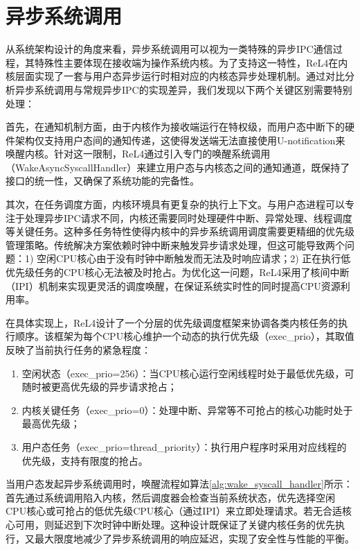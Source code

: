 \section{异步系统调用}

从系统架构设计的角度来看，异步系统调用可以视为一类特殊的异步IPC通信过程，其特殊性主要体现在接收端为操作系统内核。为了支持这一特性，ReL4在内核层面实现了一套与用户态异步运行时相对应的内核态异步处理机制。通过对比分析异步系统调用与常规异步IPC的实现差异，我们发现以下两个关键区别需要特别处理：

首先，在通知机制方面，由于内核作为接收端运行在特权级，而用户态中断下的硬件架构仅支持用户态间的通知传递，这使得发送端无法直接使用U-notification来唤醒内核。针对这一限制，ReL4通过引入专门的唤醒系统调用（WakeAsyncSyscallHandler）来建立用户态与内核态之间的通知通道，既保持了接口的统一性，又确保了系统功能的完备性。

其次，在任务调度方面，内核环境具有更复杂的执行上下文。与用户态进程可以专注于处理异步IPC请求不同，内核还需要同时处理硬件中断、异常处理、线程调度等关键任务。这种多任务特性使得内核中的异步系统调用调度需要更精细的优先级管理策略。传统解决方案依赖时钟中断来触发异步请求处理，但这可能导致两个问题：1) 空闲CPU核心由于没有时钟中断触发而无法及时响应请求；2) 正在执行低优先级任务的CPU核心无法被及时抢占。为优化这一问题，ReL4采用了核间中断（IPI）机制来实现更灵活的调度唤醒，在保证系统实时性的同时提高CPU资源利用率。

在具体实现上，ReL4设计了一个分层的优先级调度框架来协调各类内核任务的执行顺序。该框架为每个CPU核心维护一个动态的执行优先级（exec\_prio），其取值反映了当前执行任务的紧急程度：

\begin{enumerate}
    \item 空闲状态（exec\_prio=256）：当CPU核心运行空闲线程时处于最低优先级，可随时被更高优先级的异步请求抢占；
    \item 内核关键任务（exec\_prio=0）：处理中断、异常等不可抢占的核心功能时处于最高优先级；
    \item 用户态任务（exec\_prio=thread\_priority）：执行用户程序时采用对应线程的优先级，支持有限度的抢占。
\end{enumerate}

当用户态发起异步系统调用时，唤醒流程如算法\ref{alg:wake_syscall_handler}所示：首先通过系统调用陷入内核，然后调度器会检查当前系统状态，优先选择空闲CPU核心或可抢占的低优先级CPU核心（通过IPI）来立即处理请求。若无合适核心可用，则延迟到下次时钟中断处理。这种设计既保证了关键内核任务的优先执行，又最大限度地减少了异步系统调用的响应延迟，实现了安全性与性能的平衡。

